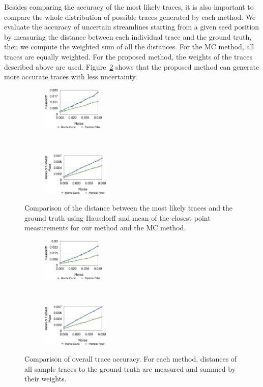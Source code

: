 Besides comparing the accuracy of the most likely traces, it is also important to compare the whole distribution of possible traces generated by each method. We evaluate the accuracy of uncertain streamlines starting from a given seed position by measuring the distance between each individual trace and the ground truth, then we compute the weighted sum of all the distances. For the MC method, all traces are equally weighted. For the proposed method, the weights of the traces described above are used. Figure~\ref{gerror_r} shows that the proposed method can generate more accurate traces with less uncertainty.

\begin{figure}[!htb]
  \centering
  \begin{subfigure}[b]{0.24\textwidth}
    \centering
    \includegraphics[height=0.8in]{../figures/doublegyre_h.eps}
  \end{subfigure}~
  \begin{subfigure}[b]{0.24\textwidth}
    \centering
    \includegraphics[height=0.8in]{../figures/doublegyre_m.eps}
  \end{subfigure}
  \caption{Comparison of the distance between the most likely traces and the ground truth using Hausdorff and mean of the closest point measurements for our method and the MC method.}
  \label{gerror}
\end{figure}

\begin{figure}[!htb]
  \centering
  \begin{subfigure}[b]{0.24\textwidth}
    \centering
    \includegraphics[height=0.8in]{../figures/doublegyre_hr.eps}
  \end{subfigure}~
  \begin{subfigure}[b]{0.24\textwidth}
    \centering
    \includegraphics[height=0.8in]{../figures/doublegyre_mr.eps}
  \end{subfigure}
  \caption{Comparison of overall trace accuracy. For each method, distances of all sample traces to the ground truth are measured and summed by their weights.}
  \label{gerror_r}
\end{figure}

